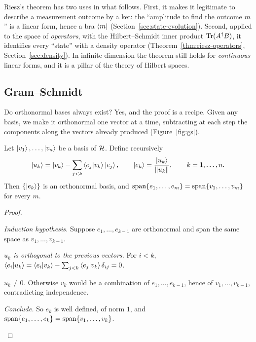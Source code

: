 \begin{lookahead}
  Riesz's theorem has two uses in what follows. First, it makes it legitimate to describe a measurement outcome by a ket: the ``amplitude to find the outcome $m$'' is a linear form, hence a bra $\left\langle m\right|$ (Section~\ref{sec:state-evolution}). Second, applied to the space of \emph{operators}, with the Hilbert--Schmidt inner product $\operatorname{Tr}(A^\dagger B)$, it identifies every ``state'' with a density operator (Theorem~\ref{thm:riesz-operators}, Section~\ref{sec:density}). In infinite dimension the theorem still holds for \emph{continuous} linear forms, and it is a pillar of the theory of Hilbert spaces.
\end{lookahead}

\subsection{Gram--Schmidt}

Do orthonormal bases always exist? Yes, and the proof is a recipe. Given any basis, we make it orthonormal one vector at a time, subtracting at each step the components along the vectors already produced (Figure~\ref{fig:gs}).

\begin{theorem}\label{thm:gs}
  Let $\left|v_1\right\rangle,\dots,\left|v_n\right\rangle$ be a basis of $\mathcal{H}$. Define recursively
  \[
    \left|u_k\right\rangle=\left|v_k\right\rangle-\sum_{j<k}\left\langle e_j\middle|v_k\right\rangle\left|e_j\right\rangle,\qquad \left|e_k\right\rangle=\frac{\left|u_k\right\rangle}{\left\|u_k\right\|},\qquad k=1,\dots,n .
  \]
  Then $\{\left|e_k\right\rangle\}$ is an orthonormal basis, and $\operatorname{span}\{e_1,\dots,e_m\}=\operatorname{span}\{v_1,\dots,v_m\}$ for every $m$.
\end{theorem}
\begin{proof}
  \begin{steps}
    \item \emph{Induction hypothesis.} Suppose $e_1,\dots,e_{k-1}$ are orthonormal and span the same space as $v_1,\dots,v_{k-1}$.
    \item \emph{$u_k$ is orthogonal to the previous vectors.} For $i<k$, $\left\langle e_i\middle|u_k\right\rangle=\left\langle e_i\middle|v_k\right\rangle-\sum_{j<k}\left\langle e_j\middle|v_k\right\rangle\delta_{ij}=0$.
    \item \emph{$u_k\neq0$.} Otherwise $v_k$ would be a combination of $e_1,\dots,e_{k-1}$, hence of $v_1,\dots,v_{k-1}$, contradicting independence.
    \item \emph{Conclude.} So $e_k$ is well defined, of norm $1$, and $\operatorname{span}\{e_1,\dots,e_k\}=\operatorname{span}\{v_1,\dots,v_k\}$. \qedhere
  \end{steps}
\end{proof}

